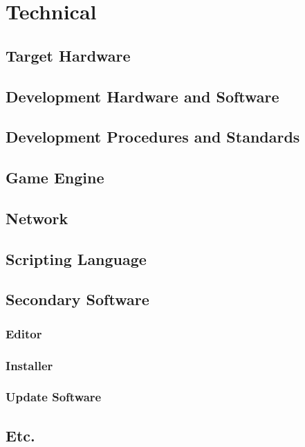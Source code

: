 
\section{Technical}

\subsection{Target Hardware}

\subsection{Development Hardware and Software}

\subsection{Development Procedures and Standards}

\subsection{Game Engine}

\subsection{Network}

\subsection{Scripting Language}

\subsection{Secondary Software}

\subsubsection{Editor}

\subsubsection{Installer}

\subsubsection{Update Software}

\subsection{Etc.}

\newpage